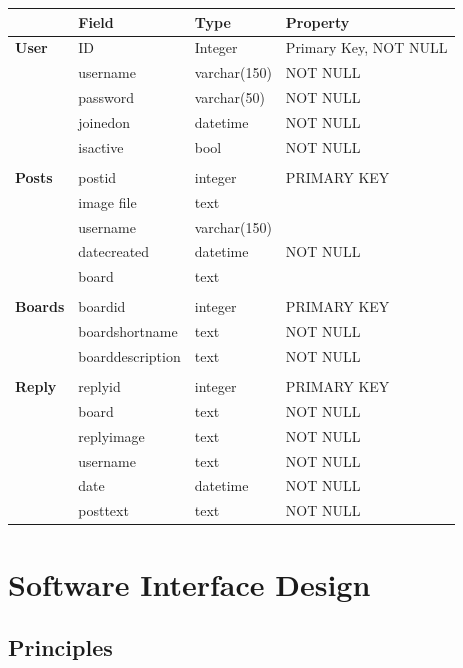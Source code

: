 \documentclass[12pt]{report}
\begin{document}
\begin{tabularx}{\textwidth} { 
  | >{\raggedright\arraybackslash}X 
  | >{\raggedright\arraybackslash}X
  | >{\raggedright\arraybackslash}X
  | >{\raggedright\arraybackslash}X |}
 \hline
  & \textbf{Field} & \textbf{Type} & \textbf{Property} \\
 \hline
 \textbf{User} & ID & Integer & Primary Key, NOT NULL \\
 \hline
 & username & varchar(150) & NOT NULL\\
 \hline
 & password & varchar(50) & NOT NULL \\
 \hline
 & joinedon & datetime & NOT NULL \\
 \hline
 & isactive & bool & NOT NULL \\
 \hline
 & & & \\
 \hline
 \textbf{Posts} & postid & integer & PRIMARY KEY\\
 \hline
 & image file & text & \\
 \hline
 & username & varchar(150) & \\
 \hline
 & datecreated & datetime & NOT NULL \\
 \hline
 & board & text & \\
 \hline
 & & &\\
 \textbf{Boards} & boardid & integer & PRIMARY KEY\\
 \hline
  & boardshortname & text & NOT NULL\\
 \hline
  & boarddescription & text & NOT NULL\\
 \hline
 & & &\\
 \hline
 \textbf{Reply} & replyid & integer & PRIMARY KEY\\
 \hline
 & board & text & NOT NULL\\
 \hline
 & replyimage & text & NOT NULL\\
 \hline
 & username & text & NOT NULL\\
 \hline
 & date & datetime & NOT NULL\\
 \hline
 & posttext & text & NOT NULL\\
 \hline
\end{tabularx}

\chapter{Software Interface Design}

\section{Principles}
\end{document}
